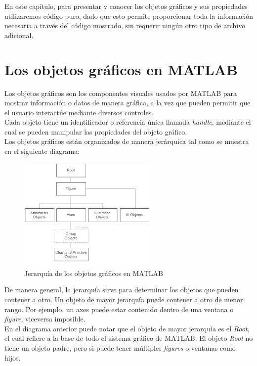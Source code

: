 En este capítulo, para presentar y conocer los objetos gráficos y sus
propiedades utilizaremos código puro, dado que esto permite proporcionar
toda la información necesaria a través del código mostrado, sin requerir
ningún otro tipo de archivo adicional.

\section{Los objetos gráficos en MATLAB}

Los objetos gráficos son los componentes visuales usados por MATLAB para
mostrar información o datos de manera gráfica, a la vez que pueden
permitir que el usuario interactúe mediante diversos controles. \\

Cada objeto tiene un identificador o referencia única llamada
\emph{handle}, mediante el cual se pueden manipular las propiedades del
objeto gráfico. \\

Los objetos gráficos están organizados de manera jerárquica tal como se
muestra en el siguiente diagrama:

\begin{figure}[htbp]
\centering
\includegraphics[width=0.6\textwidth]{src/img/ch8/objetos_graficos.png}
\caption{Jerarquía de los objetos gráficos en MATLAB}
\end{figure}

De manera general, la jerarquía sirve para determinar los objetos que
pueden contener a otro. Un objeto de mayor jerarquía puede contener a
otro de menor rango. Por ejemplo, un axes puede estar contenido dentro
de una ventana o \emph{figure}, viceversa imposible. \\

En el diagrama anterior puede notar que el objeto de mayor jerarquía es
el \emph{Root}, el cual refiere a la base de todo el sistema gráfico de
MATLAB. El objeto \emph{Root} no tiene un objeto padre, pero si puede
tener múltiples \emph{figures} o ventanas como hijos. \\


